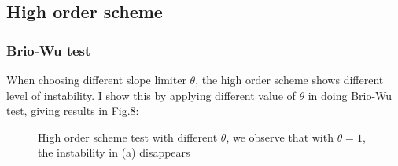 \documentclass[11pt, oneside]{article}   	%
\begin{document}
\subsection{High order scheme}
\subsubsection{Brio-Wu test}
When choosing different slope limiter $\theta$, the high order scheme shows different level of instability. I show this by applying different value of $\theta$ in doing Brio-Wu test, giving results in Fig.8:


\begin{figure}[H]
\centering
{}
\caption{High order scheme test with different $\theta$, we observe that with $\theta = 1$, the instability in (a) disappears }
\end{figure}
\end{document}
